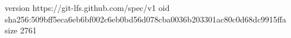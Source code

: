 version https://git-lfs.github.com/spec/v1
oid sha256:509bff5eca6eb6bf002c6eb0bd56d078cba0036b203301ac80c0d68dc9915ffa
size 2761
